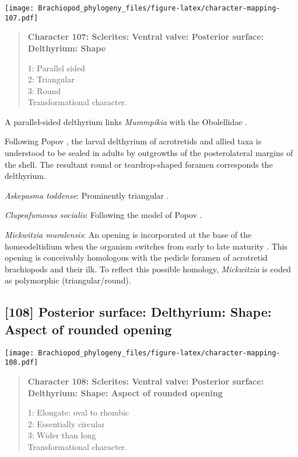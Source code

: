 \documentclass[openany]{book}
\theoremstyle{definition}
\theoremstyle{definition}
\theoremstyle{definition}
\theoremstyle{remark}
\begin{document}
\texttt{[image: Brachiopod\_phylogeny\_files/figure-latex/character-mapping-107.pdf]}

\begin{quote}
\textbf{Character 107: Sclerites: Ventral valve: Posterior surface:
Delthyrium: Shape}

1: Parallel sided\\
2: Triangular\\
3: Round\\
Transformational character.
\end{quote}

A parallel-sided delthyrium links \emph{Mummpikia} with the Obolellidae
\citep{Balthasar2008iMummpikia}.

Following Popov \citeyearpar{Popov1992TheCambrian}, the larval
delthyrium of acrotretids and allied taxa is understood to be sealed in
adults by outgrowths of the posterolateral margins of the shell. The
resultant round or teardrop-shaped foramen corresponds the delthyrium.

\hypertarget{Askepasma_toddense-coding-107}{}
\emph{Askepasma toddense}: Prominently triangular \citep[see][fig.
2]{Topper2013Theoldest}.

\hypertarget{Clupeafumosus_socialis-coding-107}{}
\emph{Clupeafumosus socialis}: Following the model of Popov
\citeyearpar{Popov1992TheCambrian}.

\hypertarget{Mickwitzia_muralensis-coding-107}{}
\emph{Mickwitzia muralensis}: An opening is incorporated at the base of
the homeodeltidium when the organism switches from early to late
maturity \citep[fig. 10 in][]{Balthasar2004Shellstructure}. This opening
is conceivably homologous with the pedicle foramen of acrotretid
brachiopods and their ilk. To reflect this possible homology,
\emph{Mickwitzia} is coded as polymorphic (triangular/round).

\subsection*{{[}108{]} Posterior surface: Delthyrium: Shape: Aspect of
rounded
opening}\label{posterior-surface-delthyrium-shape-aspect-of-rounded-opening}

\texttt{[image: Brachiopod\_phylogeny\_files/figure-latex/character-mapping-108.pdf]}

\begin{quote}
\textbf{Character 108: Sclerites: Ventral valve: Posterior surface:
Delthyrium: Shape: Aspect of rounded opening}

1: Elongate: oval to rhombic\\
2: Essentially circular\\
3: Wider than long\\
Transformational character.
\end{quote}
\end{document}

